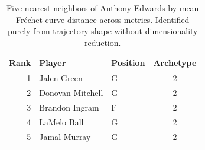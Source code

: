 \begin{table}[htbp]
  \centering\small
  \begin{tabular}{rllc}
    \toprule
    Rank & Player & Position & Archetype \\
    \midrule
    1 & Jalen Green & G & 2 \\
    2 & Donovan Mitchell & G & 2 \\
    3 & Brandon Ingram & F & 2 \\
    4 & LaMelo Ball & G & 2 \\
    5 & Jamal Murray & G & 2 \\
    \bottomrule
  \end{tabular}
  \caption{Five nearest neighbors of Anthony Edwards by mean Fr\'{e}chet curve distance across metrics. Identified purely from trajectory shape without dimensionality reduction.}
  \label{tab:Anthony_Edwards_frechet_curve_neighbors}
\end{table}

